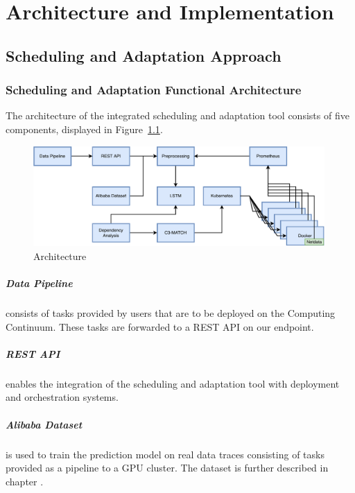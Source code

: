 \chapter{Architecture and Implementation}
\label{ch:architecture-and-implementation}

  \section{Scheduling and Adaptation Approach}
  \label{sec:scheduling-and-adaptation-approach-architecture}

    \subsection{Scheduling and Adaptation Functional Architecture}
    The architecture of the integrated \SAA{} scheduling and adaptation tool consists of five components, displayed in Figure~\ref{fig:data-cloud-architecture}.

    \begin{figure}
        \centering
        \includegraphics[width=0.99\textwidth]{figures/saa_diagram.pdf}
        \caption{\SAA Architecture}
        \label{fig:data-cloud-architecture}
    \end{figure}

      \paragraph{Data Pipeline} consists of tasks provided by users that are to be deployed on the Computing Continuum. These tasks are forwarded to a REST API on our endpoint.

      \paragraph{REST API} enables the integration of the \SAA{} scheduling and adaptation tool with deployment and orchestration systems.

      \paragraph{Alibaba Dataset} is used to train the prediction model on real data traces consisting of tasks provided as a pipeline to a GPU cluster. The dataset is further described in chapter .

